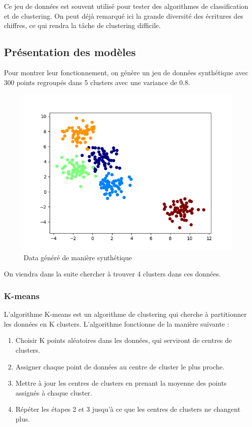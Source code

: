 \documentclass[french,a4paper,18pt]{article}
\begin{document}
Ce jeu de données est souvent utilisé pour tester des algorithmes de classification et de clustering.
On peut déjà remarqué ici la grande diversité des écritures des chiffres, ce qui rendra la tâche de clustering difficile.

\subsection{Présentation des modèles}
Pour montrer leur fonctionnement, on génère un jeu de données synthétique avec 300 points regroupés dans 5 clusters avec une variance de 0.8.
\begin{figure}[h]
    \centering
    \includegraphics[scale=0.5]{../images/short_simulation_generate_data.png}
    \caption{Data généré de manière synthétique}\label{fig:short_simulation_data}
\end{figure}

On viendra dans la suite chercher à trouver 4 clusters dans ces données.

\subsubsection{K-means}

L'algorithme K-means est un algorithme de clustering qui cherche à partitionner les données en K clusters.
L'algorithme fonctionne de la manière suivante :
\begin{enumerate}
    \item Choisir K points aléatoires dans les données, qui serviront de centres de clusters.
    \item Assigner chaque point de données au centre de cluster le plus proche.
    \item Mettre à jour les centres de clusters en prenant la moyenne des points assignés à chaque cluster.
    \item Répéter les étapes 2 et 3 jusqu'à ce que les centres de clusters ne changent plus.
\end{enumerate}
\end{document}
